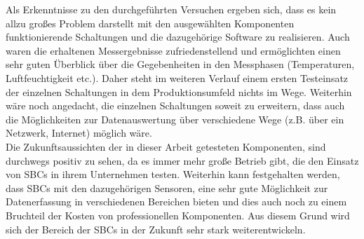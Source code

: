 Als Erkenntnisse zu den durchgeführten Versuchen ergeben sich, dass es kein allzu großes Problem darstellt mit den ausgewählten Komponenten funktionierende Schaltungen und die dazugehörige Software zu realisieren. Auch waren die erhaltenen Messergebnisse zufriedenstellend und ermöglichten einen sehr guten Überblick über die Gegebenheiten in den Messphasen (Temperaturen, Luftfeuchtigkeit etc.). Daher steht im weiteren Verlauf einem ersten Testeinsatz der einzelnen Schaltungen in dem Produktionsumfeld nichts im Wege. Weiterhin wäre noch angedacht, die einzelnen Schaltungen soweit zu erweitern, dass auch die Möglichkeiten zur Datenauswertung über verschiedene Wege (z.B. über ein Netzwerk, Internet) möglich wäre.\\

Die Zukunftsaussichten der in dieser Arbeit getesteten Komponenten, sind durchwegs positiv zu sehen, da es immer mehr große Betrieb gibt, die den Einsatz von SBCs in ihrem Unternehmen testen. Weiterhin kann festgehalten werden, dass SBCs mit den dazugehörigen Sensoren, eine sehr gute Möglichkeit zur Datenerfassung in verschiedenen Bereichen bieten und dies auch noch zu einem Bruchteil der Kosten von professionellen Komponenten. Aus diesem Grund wird sich der Bereich der SBCs in der Zukunft sehr stark weiterentwickeln.
